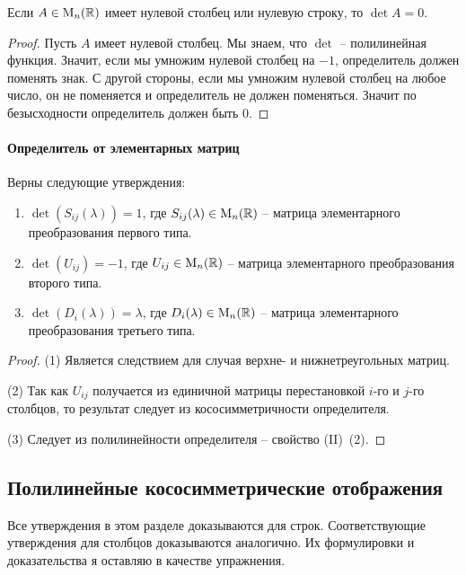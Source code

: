 \begin{claim*}
Если $A\in\operatorname{M}_{n}(\mathbb R)$ имеет нулевой столбец или нулевую строку, то $\det A = 0$.
\end{claim*}
\begin{proof}
Пусть $A$ имеет нулевой столбец.
Мы знаем, что $\det$ -- полилинейная функция.
Значит, если мы умножим нулевой столбец на $-1$, определитель должен поменять знак.
С другой стороны, если мы умножим нулевой столбец на любое число, он не поменяется и определитель не должен поменяться.
Значит по безысходности определитель должен быть $0$.
\end{proof}


\paragraph{Определитель от элементарных матриц}

\begin{claim}
Верны следующие утверждения:
\begin{enumerate}
\item $\det (S_{ij}(\lambda)) = 1$, где $S_{ij}(\lambda)\in\operatorname{M}_{n}(\mathbb R)$ -- матрица элементарного преобразования первого типа.

\item $\det (U_{ij}) = -1$, где $U_{ij}\in\operatorname{M}_{n}(\mathbb R)$ -- матрица элементарного преобразования второго типа.

\item $\det(D_i(\lambda)) = \lambda$, где $D_{i}(\lambda)\in\operatorname{M}_{n}(\mathbb R)$ -- матрица элементарного преобразования третьего типа.
\end{enumerate}
\end{claim}
\begin{proof}
(1) Является следствием для случая верхне- и нижнетреугольных матриц.

(2) Так как $U_{ij}$ получается из единичной матрицы перестановкой $i$-го и $j$-го столбцов, то результат следует из кососимметричности определителя.

(3) Следует из полилинейности определителя -- свойство (II)~(2).
\end{proof}




\subsection{Полилинейные кососимметрические отображения}

Все утверждения в этом разделе доказываются для строк.
Соответствующие утверждения для столбцов доказываются аналогично.
Их формулировки и доказательства я оставляю в качестве упражнения.

